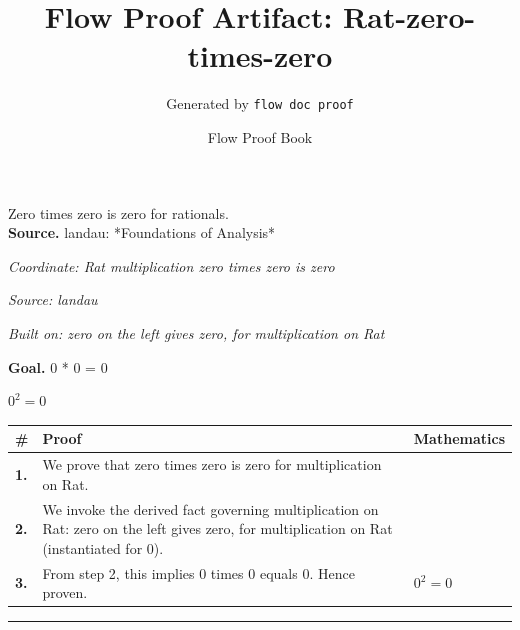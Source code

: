 \documentclass[11pt]{article}
\title{Flow Proof Artifact: Rat-zero-times-zero}
\author{Generated by \texttt{flow doc proof}}
\date{Flow Proof Book}
\theoremstyle{definition}
\begin{document}
\maketitle
Zero times zero is zero for rationals.\\[0.5em]
\textbf{Source.} landau: *Foundations of Analysis*\\[0.5em]
\bigskip
{}\par
\smallskip\noindent\textit{Coordinate: Rat \cdot multiplication \cdot zero times zero is zero}\par
\smallskip\noindent\textit{Source: landau}\par
\smallskip\noindent\textit{Built on: zero on the left gives zero, for multiplication on Rat}\par
\medskip
\noindent\textbf{Goal.} 0 * 0 = 0\par
\noindent$\displaystyle 0^{2} = 0$\par
\medskip
\noindent
\begin{tabular}{@{} >{\raggedright\arraybackslash}p{} >{\raggedright\arraybackslash}p{} >{\raggedleft\arraybackslash}p{} @{}}
\textbf{\#} & \textbf{Proof} & \textbf{Mathematics} \\
\midrule
\textbf{1.} & We prove that zero times zero is zero for multiplication on Rat. & \\[0.45em]
\textbf{2.} & We invoke the derived fact governing multiplication on Rat: zero on the left gives zero, for multiplication on Rat (instantiated for 0). & \\[0.45em]
\textbf{3.} & From step 2, this implies 0 times 0 equals 0. Hence proven. & $\displaystyle 0^{2} = 0$ \\[0.45em]
\bottomrule
\end{tabular}
\label{thm:Rat-multiplication-zero_times_zero_is_zero}
\par\medskip\hrule
\end{document}

